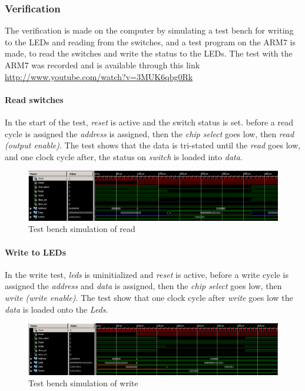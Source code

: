 \subsubsection{Verification}
The verification is made on the computer by simulating a test bench for writing to the LEDs and reading from the switches, and a test program on the ARM7 is made, to read the switches and write the status to the LEDs. The test with the ARM7 was recorded and is available through this link \url{http://www.youtube.com/watch?v=3MUK6qbg0Rk}
\paragraph{Read switches}
In the start of the test, \textit{reset} is active and the switch status is set. before a read cycle is assigned the \textit{address} is assigned, then the \textit{chip select} goes low, then \textit{read (output enable)}. The test shows that the data is tri-stated until the \textit{read} goes low, and one clock cycle after, the status on \textit{switch} is loaded into \textit{data}.
\begin{figure}[H]
	\begin{centering}
		\includegraphics[width=1.0\textwidth]{content/appendix/eudp/images/tb_wb_read.png}
		\caption{Test bench simulation of read}
	\end{centering}
\end{figure}
\paragraph{Write to LEDs}
In the write test, \textit{leds} is uninitialized and \textit{reset} is active, before a write cycle is assigned the \textit{address} and \textit{data} is assigned, then the \textit{chip select} goes low, then \textit{write (write enable)}. The test show that one clock cycle after \textit{write} goes low the \textit{data} is loaded onto the \textit{Leds}.
\begin{figure}[H]
	\begin{centering}
		\includegraphics[width=1.0\textwidth]{content/appendix/eudp/images/tb_wb_write.png}
		\caption{Test bench simulation of write}
	\end{centering}
\end{figure}
